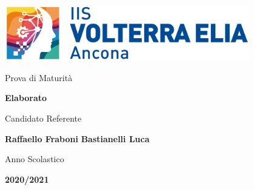 \begin{titlepage}
    \centering

    \includegraphics[width=0.8\textwidth]{images/logo/logoSitoBase1.jpg}

    \vfill
    \vfill

    {\large Prova di Maturit\`a}

    \vspace{3px}

    \textbf{\huge Elaborato}

    \vspace{5cm}
    
    \hfill
    {\Large Candidato}
    \hfill
    \hfill
    {\Large Referente}
    \hfill\null

    \vspace{5px}

    \hfill
    \textbf{\LARGE Raffaello Fraboni}
    \hfill
    \hfill
    \textbf{\LARGE Bastianelli Luca}
    \hfill\null

    \vfill

    {\large Anno Scolastico}
    
    \vspace{5px}

    \textbf{\Large 2020/2021}
\end{titlepage}
